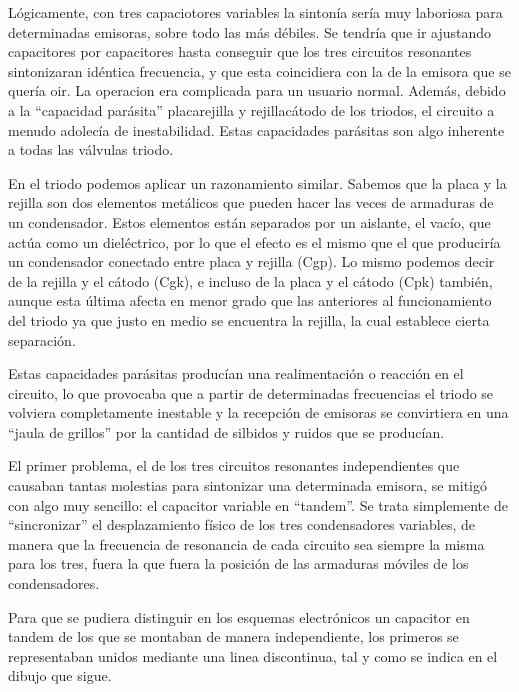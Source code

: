\documentclass[a4paper,10pt,spanish]{report}
\let\sphinxpxdimen\pdfpxdimen\else\newdimen\sphinxpxdimen
\begin{document}
Lógicamente, con tres capaciotores variables la sintonía sería muy laboriosa para determinadas emisoras, sobre todo las más débiles. Se tendría que ir ajustando capacitores por capacitores hasta conseguir que los tres circuitos resonantes sintonizaran idéntica frecuencia, y que esta coincidiera con la de la emisora que se quería oir. La operacion era complicada para un usuario normal. Además, debido a la “capacidad parásita” placa\sphinxhyphen{}rejilla y rejilla\sphinxhyphen{}cátodo de los triodos, el circuito a menudo
adolecía de inestabilidad. Estas capacidades parásitas son algo inherente a todas las válvulas triodo.

En el triodo podemos aplicar un razonamiento similar. Sabemos que la placa y la rejilla son dos elementos metálicos que pueden hacer las veces de armaduras de un condensador. Estos elementos están separados por un aislante, el vacío, que actúa como un dieléctrico, por lo que el efecto es el mismo que el que produciría un condensador conectado entre placa y rejilla (Cgp). Lo mismo podemos decir de la rejilla y el cátodo (Cgk), e incluso de la placa y el cátodo (Cpk) también, aunque esta última
afecta en menor grado que las anteriores al funcionamiento del triodo ya que justo en medio se encuentra la rejilla, la cual establece cierta separación.

Estas capacidades parásitas producían una realimentación o reacción en el circuito, lo que provocaba que a partir de determinadas frecuencias el triodo se volviera completamente inestable y la recepción de emisoras se convirtiera en una “jaula de grillos” por la cantidad de silbidos y ruidos que se producían.

El primer problema, el de los tres circuitos resonantes independientes que causaban tantas molestias para sintonizar una determinada emisora, se mitigó con algo muy sencillo: el capacitor variable en “tandem”. Se trata simplemente de “sincronizar” el desplazamiento físico de los tres condensadores variables, de manera que la frecuencia de resonancia de cada circuito sea siempre la misma para los tres, fuera la que fuera la posición de las armaduras móviles de los condensadores.

Para que se pudiera distinguir en los esquemas electrónicos un capacitor en tandem de los que se montaban de manera independiente, los primeros se representaban unidos mediante una linea discontinua, tal y como se indica en el dibujo que sigue.

\sphinxincludegraphics[width=588\sphinxpxdimen,height=213\sphinxpxdimen]{{receprfs2low}.png}
\end{document}
